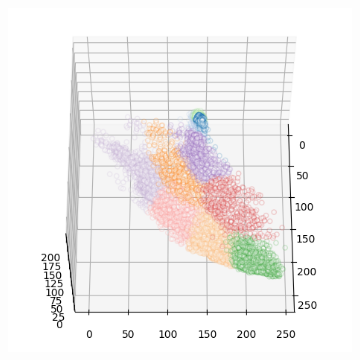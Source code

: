 \begin{figure}[htbp]
\begin{subfigure}[t]{0.32\textwidth}
    \end{subfigure}
    \begin{subfigure}[t]{0.32\textwidth}
        \includegraphics[width=\linewidth]{../../python_code/plots/kmeans/flower-14/clusters_elev60_azim0.png}
    \end{subfigure}
\end{figure}

